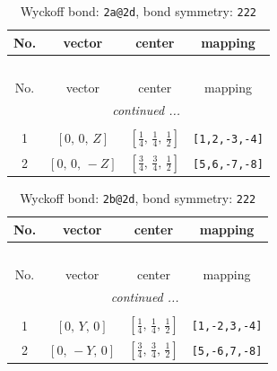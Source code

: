 \documentclass[fleqn,8pt]{jsarticle}
\begin{document}
\begin{longtable}{cccc}
\caption{Wyckoff bond: {\tt 2a@2d}, bond symmetry: {\tt 222}}
 \\
 \hline \hline
No. & vector & center & mapping \\ \hline \endfirsthead

\multicolumn{3}{l}{\tablename\ \thetable{}} \\
 \hline \hline
No. & vector & center & mapping \\ \hline \endhead

 \hline \hline
\multicolumn{3}{r}{\footnotesize\it continued ...} \\ \endfoot

 \hline \hline
\multicolumn{3}{r}{} \\ \endlastfoot

1 & $\left[ 0,\, 0,\, Z \right]$ & $\left[ \frac{1}{4},\, \frac{1}{4},\, \frac{1}{2} \right]$ & {\tt [1,2,-3,-4]} \\ \hline
2 & $\left[ 0,\, 0,\, - Z \right]$ & $\left[ \frac{3}{4},\, \frac{3}{4},\, \frac{1}{2} \right]$ & {\tt [5,6,-7,-8]} \\
\end{longtable}
\renewcommand{\arraystretch}{1.2}
\begin{longtable}{cccc}
\caption{Wyckoff bond: {\tt 2b@2d}, bond symmetry: {\tt 222}}
 \\
 \hline \hline
No. & vector & center & mapping \\ \hline \endfirsthead

\multicolumn{3}{l}{\tablename\ \thetable{}} \\
 \hline \hline
No. & vector & center & mapping \\ \hline \endhead

 \hline \hline
\multicolumn{3}{r}{\footnotesize\it continued ...} \\ \endfoot

 \hline \hline
\multicolumn{3}{r}{} \\ \endlastfoot

1 & $\left[ 0,\, Y,\, 0 \right]$ & $\left[ \frac{1}{4},\, \frac{1}{4},\, \frac{1}{2} \right]$ & {\tt [1,-2,3,-4]} \\ \hline
2 & $\left[ 0,\, - Y,\, 0 \right]$ & $\left[ \frac{3}{4},\, \frac{3}{4},\, \frac{1}{2} \right]$ & {\tt [5,-6,7,-8]} \\
\end{longtable}
\renewcommand{\arraystretch}{1.2}
\end{document}
